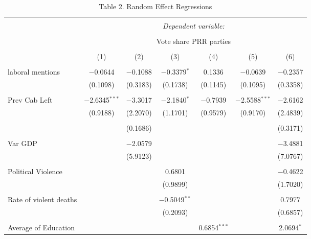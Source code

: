 
\begin{table}[!htbp] \centering 
  \caption{Table 2. Random Effect Regressions} 
  \label{} 
\begin{tabular}{@{\extracolsep{5pt}}lcccccc} 
\\[-1.8ex]\hline 
\hline \\[-1.8ex] 
 & \multicolumn{6}{c}{\textit{Dependent variable:}} \\ 
\cline{2-7} 
\\[-1.8ex] & \multicolumn{6}{c}{Vote share PRR parties} \\ 
\\[-1.8ex] & (1) & (2) & (3) & (4) & (5) & (6)\\ 
\hline \\[-1.8ex] 
 laboral mentions & $-$0.0644 & $-$0.1088 & $-$0.3379$^{*}$ & 0.1336 & $-$0.0639 & $-$0.2357 \\ 
  & (0.1098) & (0.3183) & (0.1738) & (0.1145) & (0.1095) & (0.3358) \\ 
  & & & & & & \\ 
 Prev Cab Left & $-$2.6345$^{***}$ & $-$3.3017 & $-$2.1840$^{*}$ & $-$0.7939 & $-$2.5588$^{***}$ & $-$2.6162 \\ 
  & (0.9188) & (2.2070) & (1.1701) & (0.9579) & (0.9170) & (2.4839) \\ 
  & & & & & & \\ 
  &  & (0.1686) &  &  &  & (0.3171) \\ 
  & & & & & & \\ 
 Var GDP &  & $-$2.0579 &  &  &  & $-$3.4881 \\ 
  &  & (5.9123) &  &  &  & (7.0767) \\ 
  & & & & & & \\ 
 Political Violence &  &  & 0.6801 &  &  & $-$0.4622 \\ 
  &  &  & (0.9899) &  &  & (1.7020) \\ 
  & & & & & & \\ 
 Rate of violent deaths &  &  & $-$0.5049$^{**}$ &  &  & 0.7977 \\ 
  &  &  & (0.2093) &  &  & (0.6857) \\ 
  & & & & & & \\ 
 Average of Education &  &  &  & 0.6854$^{***}$ &  & 2.0694$^{*}$ \\ 

\end{tabular}
\end{table}
